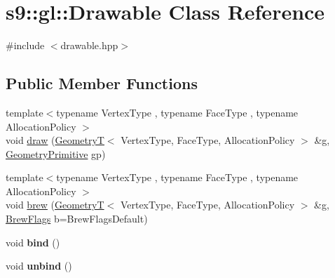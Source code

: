 \hypertarget{classs9_1_1gl_1_1Drawable}{\section{s9\-:\-:gl\-:\-:\-Drawable \-Class \-Reference}
\label{classs9_1_1gl_1_1Drawable}
}


{\ttfamily \#include $<$drawable.\-hpp$>$}

\subsection*{\-Public \-Member \-Functions}
\begin{DoxyCompactItemize}
\item 
{\footnotesize template$<$typename Vertex\-Type , typename Face\-Type , typename Allocation\-Policy $>$ }\\void \hyperlink{classs9_1_1gl_1_1Drawable_a17009f367a17d45ac7f9245b15229c95}{draw} (\hyperlink{classs9_1_1GeometryT}{\-Geometry\-T}$<$ \-Vertex\-Type, \-Face\-Type, \-Allocation\-Policy $>$ \&g, \hyperlink{namespaces9_ad57d1332f8fd67d23f6a1d3520ab785c}{\-Geometry\-Primitive} gp)
\item 
{\footnotesize template$<$typename Vertex\-Type , typename Face\-Type , typename Allocation\-Policy $>$ }\\void \hyperlink{classs9_1_1gl_1_1Drawable_ac45a196466c96705860cff9f8898673f}{brew} (\hyperlink{classs9_1_1GeometryT}{\-Geometry\-T}$<$ \-Vertex\-Type, \-Face\-Type, \-Allocation\-Policy $>$ \&g, \hyperlink{structs9_1_1gl_1_1BrewFlags}{\-Brew\-Flags} b=\-Brew\-Flags\-Default)
\item 
\hypertarget{classs9_1_1gl_1_1Drawable_ae616cb10c8f213e08914acb760e0a087}{void {\bfseries bind} ()}\label{classs9_1_1gl_1_1Drawable_ae616cb10c8f213e08914acb760e0a087}

\item 
\hypertarget{classs9_1_1gl_1_1Drawable_a6a55c040167e67f808adce694ae425f5}{void {\bfseries unbind} ()}\label{classs9_1_1gl_1_1Drawable_a6a55c040167e67f808adce694ae425f5}

\end{DoxyCompactItemize}
